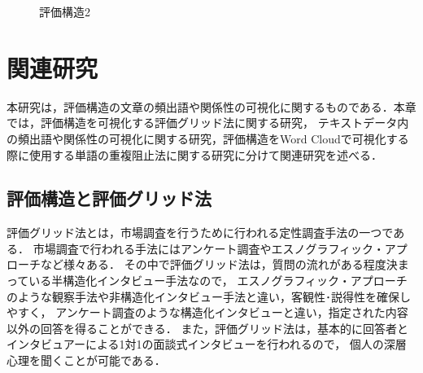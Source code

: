 \documentclass[syuuron]{kuee}
\begin{document}
		\begin{figure}
			\begin{center}
			\end{center}
			\caption{評価構造2}
	  		\label{fig:es3}
		\end{figure}

\chapter{関連研究}
	本研究は，評価構造の文章の頻出語や関係性の可視化に関するものである．本章では，評価構造を可視化する評価グリッド法に関する研究，
	テキストデータ内の頻出語や関係性の可視化に関する研究，評価構造をWord Cloudで可視化する際に使用する単語の重複阻止法に関する研究に分けて関連研究を述べる．
	\section{評価構造と評価グリッド法}
		評価グリッド法とは，市場調査を行うために行われる定性調査手法の一つである．
		市場調査で行われる手法にはアンケート調査やエスノグラフィック・アプローチなど様々ある．
		その中で評価グリッド法は，質問の流れがある程度決まっている半構造化インタビュー手法なので，
		エスノグラフィック・アプローチのような観察手法や非構造化インタビュー手法と違い，客観性･説得性を確保しやすく，
		アンケート調査のような構造化インタビューと違い，指定された内容以外の回答を得ることができる．
		また，評価グリッド法は，基本的に回答者とインタビュアーによる1対1の面談式インタビューを行われるので，
		個人の深層心理を聞くことが可能である．
		
\end{document}
